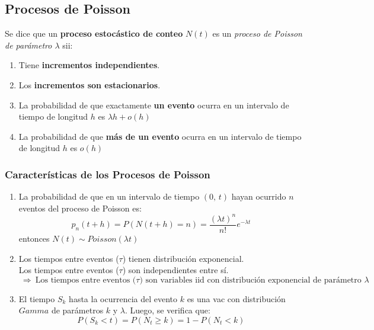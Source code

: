 \documentclass{article}
\newcommand{\comma}{,\,}                                %
\newcommand{\Rightarrows}{\: \Rightarrow \:}            %
\begin{document}
\subsection{Procesos de Poisson}
Se dice que un \textbf{proceso estocástico de conteo} $N(t)$ es un \emph{proceso de Poisson de parámetro $\lambda$} sii:
\begin{enumerate}
    \item Tiene \textbf{incrementos independientes}.
    \item Los \textbf{incrementos son estacionarios}.
    \item La probabilidad de que exactamente \textbf{un evento} ocurra en un intervalo de tiempo de longitud $h$ es $\lambda h + o(h)$
    \item La probabilidad de que \textbf{más de un evento} ocurra en un intervalo de tiempo de longitud $h$ es $o(h)$
\end{enumerate}

\subsubsection*{Características de los Procesos de Poisson}
\begin{enumerate}
    \item La probabilidad de que en un intervalo de tiempo $(0 \comma t)$ hayan ocurrido $n$ eventos del proceso de Poisson es:
    \begin{equation*}
        p_n(t + h) = P(N(t + h) = n) = \frac{(\lambda t)^n}{n!} e^{-\lambda t}
    \end{equation*}
    entonces $N(t) \sim Poisson(\lambda t)$
    \item Los tiempos entre eventos ($\tau$) tienen distribución exponencial.
    \\Los tiempos entre eventos ($\tau$) son independientes entre sí.
    \begin{equation*}
        \Rightarrows \text{Los tiempos entre eventos ($\tau$) son variables iid con distribución exponencial de parámetro $\lambda$}
    \end{equation*}
    \item El tiempo $S_k$ hasta la ocurrencia del evento $k$ es una vac con distribución $Gamma$ de parámetros $k$ y $\lambda$. Luego, se verifica que:
    \begin{equation*}
        P(S_k < t) = P(N_t \geq k) = 1 - P(N_t < k)
    \end{equation*}
\end{enumerate}
\end{document}
